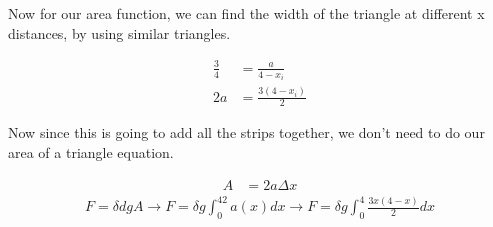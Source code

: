 Now for our area function, we can find the width of the triangle at different x distances, by using similar triangles.

\begin{align*}
	\frac{3}{4} &= \frac{a}{4-x_i} \\ 
	2a &= \frac{3(4-x_i)}{2}
\end{align*}

Now since this is going to add all the strips together, we don't need to do our area of a triangle equation. 

\begin{align}
	A &= 2a\Delta x 
\end{align} 
\begin{align}
	F = \delta dgA \to F = \delta g \int_0^42a(x)dx \to F = \delta g\int_0^4\frac{3x(4-x)}{2}dx
\end{align}
